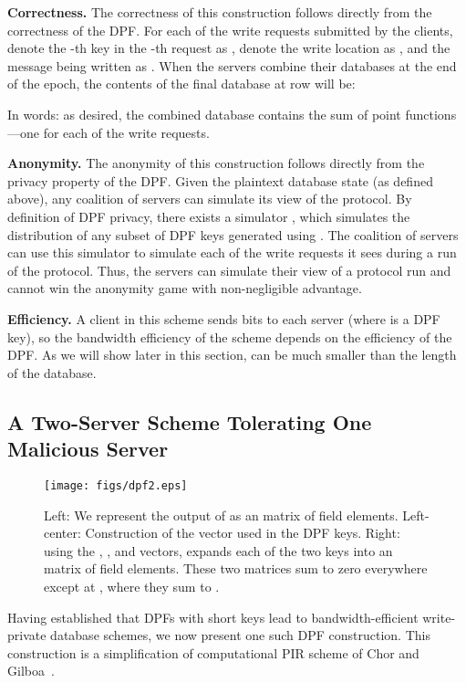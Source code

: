 \documentclass[10pt,twocolumn]{article}
\newcommand{\nicepara}[1]{\medskip\noindent\textbf{#1.}}
\begin{document}
\nicepara{Correctness}
The correctness of this construction follows directly
from the correctness of the DPF.
For each of the  write requests submitted by the clients, 
denote the -th key in the -th request as ,
denote the write location as , and the message
being written as .
When the servers combine their databases at the end of the
epoch, the contents of the final database at row  will be:

In words: as desired, 
the combined database contains the sum of  point
functions---one for each of the write requests.

\nicepara{Anonymity}
The anonymity of this construction 
follows directly from the privacy property of the DPF.
Given the plaintext database state  (as defined above),
any coalition of  servers can simulate its view of the protocol.
By definition of DPF privacy, there exists
a simulator , which simulates the
distribution of any subset of  DPF keys generated
using .
The coalition of servers can use this simulator to simulate each
of the  write requests it sees during a run of the protocol.
Thus, the servers can simulate their view of a
protocol run and cannot win the anonymity game
with non-negligible advantage. 

\nicepara{Efficiency}
A client in this scheme sends  bits to each
server (where  is a DPF key), so the 
bandwidth efficiency of 
the scheme depends on the efficiency of the DPF.
As we will show later in this section,  can be
much smaller than the length of the database.

\subsection{A Two-Server Scheme Tolerating One Malicious Server}
\label{sec:dpf:twoserver}

\begin{figure*}
\centering
\texttt{[image: figs/dpf2.eps]}
\caption{Left: We represent the 
output of  as an  matrix of field
elements.
Left-center: Construction of the  vector used
in the DPF keys.
Right: using the , , and  vectors,
 expands each of the two keys into an 
 matrix of field elements.
These two matrices sum to zero everywhere except 
at , where they sum to .
}
\label{fig:dpf}
\end{figure*}


Having established that DPFs with short keys lead to 
bandwidth-efficient write-private database schemes,
we now present one such DPF construction. 
This construction is a simplification of
computational PIR scheme of Chor and 
Gilboa~\cite{chor1997computationally}.
\end{document}
